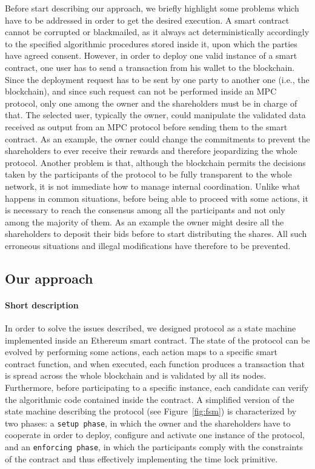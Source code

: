 Before start describing our approach, we briefly highlight some problems which have to be addressed in order to get the desired execution.
\newline
A smart contract cannot be corrupted or blackmailed, as it always act deterministically accordingly to the specified algorithmic procedures stored inside it, upon which the parties have agreed consent. 
However, in order to deploy one valid instance of a smart contract, one user has to send a transaction from his wallet to the blockchain. Since the deployment request has to be sent by one party to another one (i.e., the blockchain), and since such request can not be performed inside an MPC protocol, only one among the owner and the shareholders must be in charge of that.  
The selected user, typically the owner, could manipulate the validated data received as output from an MPC protocol before sending them to the smart contract. As an example, the owner could change the commitments to prevent the shareholders to ever receive their rewards and therefore jeopardizing the whole protocol.
\newline
Another problem is that, although the blockchain permits the decisions taken by the participants of the protocol to be fully transparent to the whole network, it is not immediate how to manage internal coordination. Unlike what happens in common situations, before being able to proceed with some actions, it is necessary to reach the consensus among all the participants and not only among the majority of them. As an example the owner might desire all the shareholders to deposit their bids before to start distributing the shares.
All such erroneous situations and illegal modifications have therefore to be prevented.

\subsection{Our approach}\label{sect:our_approach}

\paragraph{Short description} 
In order to solve the issues described, we designed \shortname protocol as a state machine implemented inside an Ethereum smart contract. The state of the protocol can be evolved by performing some actions, each action maps to a specific smart contract function, and when executed, each function produces a transaction that is spread across the whole blockchain and is validated by all its nodes. Furthermore, before participating to a specific instance, each candidate can verify the algorithmic code contained inside the contract. 
\newline
A simplified version of the state machine describing the protocol (see Figure~\ref{fig:fsm}) is characterized by two phases: a \texttt{setup phase}, in which the owner and the shareholders have to cooperate in order to deploy, configure and activate one instance of the protocol, and an \texttt{enforcing phase}, in which the participants comply with the constraints of the contract and thus effectively implementing the time lock primitive.

